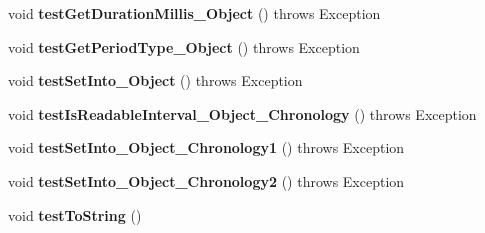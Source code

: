 \begin{DoxyCompactItemize}
\item 
\hypertarget{classorg_1_1joda_1_1time_1_1convert_1_1_test_null_converter_a10182763c40d0d5112791998a4da90f4}{void {\bfseries test\-Get\-Duration\-Millis\-\_\-\-Object} ()  throws Exception }\label{classorg_1_1joda_1_1time_1_1convert_1_1_test_null_converter_a10182763c40d0d5112791998a4da90f4}

\item 
\hypertarget{classorg_1_1joda_1_1time_1_1convert_1_1_test_null_converter_abac605957f2624b5f77934ff3fd39837}{void {\bfseries test\-Get\-Period\-Type\-\_\-\-Object} ()  throws Exception }\label{classorg_1_1joda_1_1time_1_1convert_1_1_test_null_converter_abac605957f2624b5f77934ff3fd39837}

\item 
\hypertarget{classorg_1_1joda_1_1time_1_1convert_1_1_test_null_converter_aa415c1c715d78ecdb89bca9ff800c320}{void {\bfseries test\-Set\-Into\-\_\-\-Object} ()  throws Exception }\label{classorg_1_1joda_1_1time_1_1convert_1_1_test_null_converter_aa415c1c715d78ecdb89bca9ff800c320}

\item 
\hypertarget{classorg_1_1joda_1_1time_1_1convert_1_1_test_null_converter_a21661b197c8a4861b627a33109d7c288}{void {\bfseries test\-Is\-Readable\-Interval\-\_\-\-Object\-\_\-\-Chronology} ()  throws Exception }\label{classorg_1_1joda_1_1time_1_1convert_1_1_test_null_converter_a21661b197c8a4861b627a33109d7c288}

\item 
\hypertarget{classorg_1_1joda_1_1time_1_1convert_1_1_test_null_converter_adc4b8dadd0c8f23e0b36b8db8864431f}{void {\bfseries test\-Set\-Into\-\_\-\-Object\-\_\-\-Chronology1} ()  throws Exception }\label{classorg_1_1joda_1_1time_1_1convert_1_1_test_null_converter_adc4b8dadd0c8f23e0b36b8db8864431f}

\item 
\hypertarget{classorg_1_1joda_1_1time_1_1convert_1_1_test_null_converter_a206cce8ec6e23bbd0c2cd9a442b1cdc4}{void {\bfseries test\-Set\-Into\-\_\-\-Object\-\_\-\-Chronology2} ()  throws Exception }\label{classorg_1_1joda_1_1time_1_1convert_1_1_test_null_converter_a206cce8ec6e23bbd0c2cd9a442b1cdc4}

\item 
\hypertarget{classorg_1_1joda_1_1time_1_1convert_1_1_test_null_converter_a87a51c28876309102826e5d49a16938e}{void {\bfseries test\-To\-String} ()}\label{classorg_1_1joda_1_1time_1_1convert_1_1_test_null_converter_a87a51c28876309102826e5d49a16938e}

\end{DoxyCompactItemize}
